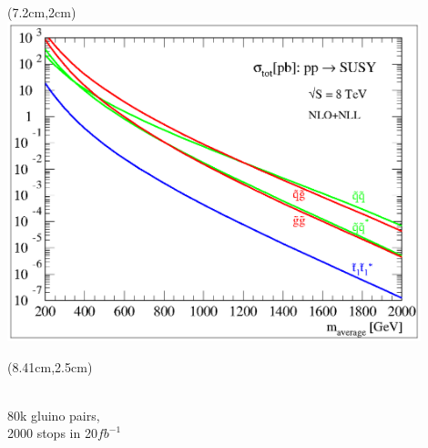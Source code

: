 \documentclass[compress, serif]{beamer}
\begin{document}
{\begin{textblock*}{6cm}(7.2cm,2cm) %
\includegraphics[width=0.9\textwidth, trim = .6cm .1cm .54cm .1cm, clip=true]{../figures/nlonll_lhc8_tpformat.eps}
\end{textblock*}
\begin{textblock*}{10cm}(8.41cm,2.5cm) %
~\\80k gluino pairs,\\2000 stops in 20$fb^{-1}$
\end{textblock*}
}
\end{document}
